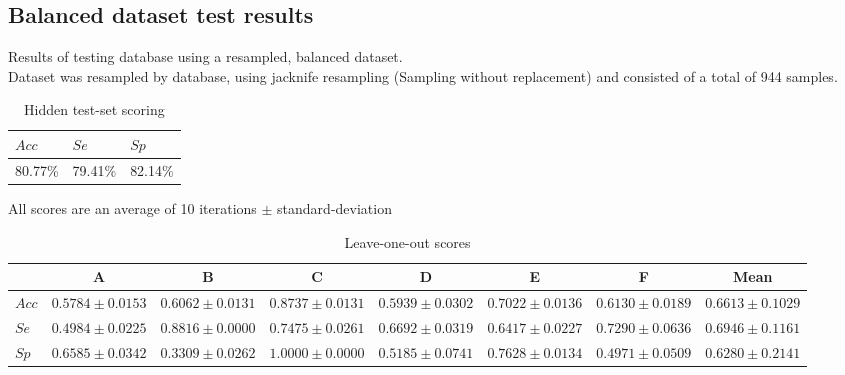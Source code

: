 \documentclass[titlepage, 12pt]{scrartcl} \usepackage{enumitem}
\begin{document}
\pagebreak
\subsection{Balanced dataset test results}\label{appendixC}
Results of testing database using a resampled, balanced dataset.\\
Dataset was resampled by database, using jacknife resampling (Sampling without
replacement) and consisted of a total of 944 samples.
\begin{table}[H]
\centering
\caption{Hidden test-set scoring}
\begin{tabular}{@{}lll@{}}
\toprule
$Acc$  & $Se$    & $Sp$    \\ \midrule
80.77\% & 79.41\% & 82.14\% \\ \bottomrule
\end{tabular}
\end{table}

\begin{table}[H]
\doublespacing
\caption{Leave-one-out scores}
\footnotesize
All scores are an average of 10 iterations $\pm$ standard-deviation
\scriptsize
\centering
\begin{tabulary}{\linewidth}{LCCCCCCC}
\toprule
       & A                 & B                 & C                 & D                 & E                 & F                 & Mean              \\ \midrule
$Acc$ & $0.5784\pm0.0153$ & $0.6062\pm0.0131$ & $0.8737\pm0.0131$ & $0.5939\pm0.0302$ & $0.7022\pm0.0136$ & $0.6130\pm0.0189$ & $0.6613\pm0.1029$ \\
$Se$   & $0.4984\pm0.0225$ & $0.8816\pm0.0000$ & $0.7475\pm0.0261$ & $0.6692\pm0.0319$ & $0.6417\pm0.0227$ & $0.7290\pm0.0636$ & $0.6946\pm0.1161$ \\
$Sp$   & $0.6585\pm0.0342$ & $0.3309\pm0.0262$  & $1.0000\pm0.0000$ & $0.5185\pm0.0741$ & $0.7628\pm0.0134$ & $0.4971\pm0.0509$ & $0.6280\pm0.2141$ \\ \bottomrule
\end{tabulary}
\end{table}
\end{document}
